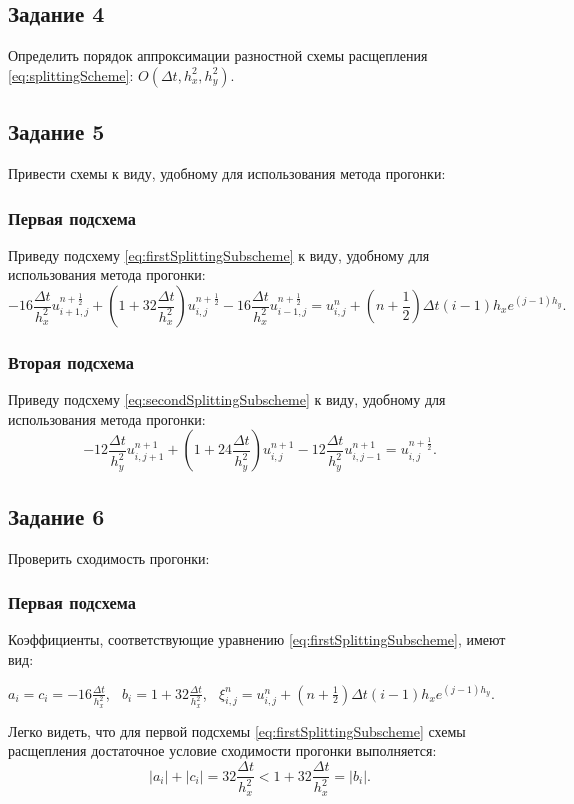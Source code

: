 \documentclass[12pt, a4paper]{report}
\begin{document}
	\subsection*{Задание 4}
	\large
	Определить порядок аппроксимации разностной схемы расщепления \eqref{eq:splittingScheme}: $O(\Delta t, h_{x}^{2}, h_{y}^{2})$.

	\subsection*{Задание 5}
	\large
	Привести схемы к виду, удобному для использования метода прогонки: \par
	\subsubsection*{Первая подсхема}
	\large
	Приведу подсхему \eqref{eq:firstSplittingSubscheme} к виду, удобному для использования метода прогонки:
	\small
	\begin{equation*}
		-16\frac{\Delta t}{h_{x}^{2}}u_{i+1, j}^{n+\frac{1}{2}} + (1 + 32\frac{\Delta t}{h_{x}^{2}})u_{i, j}^{n+\frac{1}{2}} - 16\frac{\Delta t}{h_{x}^{2}}u_{i-1, j}^{n+\frac{1}{2}} = u_{i, j}^{n} + (n + \frac{1}{2})\Delta t(i-1)h_{x}e^{(j-1)h_{y}}.
	\end{equation*}
	\subsubsection*{Вторая подсхема}
	\large
	Приведу подсхему \eqref{eq:secondSplittingSubscheme} к виду, удобному для использования метода прогонки:
	\begin{equation*}
		-12\frac{\Delta t}{h_{y}^{2}}u_{i, j+1}^{n+1} + (1 + 24\frac{\Delta t}{h_{y}^{2}})u_{i, j}^{n+1} - 12\frac{\Delta t}{h_{y}^{2}}u_{i, j-1}^{n+1} = u_{i, j}^{n+\frac{1}{2}}.
	\end{equation*}

	\subsection*{Задание 6}
	\large
	Проверить сходимость прогонки:
	\subsubsection*{Первая подсхема}
	\large
	Коэффициенты, соответствующие уравнению \eqref{eq:firstSplittingSubscheme}, имеют вид:
	\small
	\begin{center}
		$a_{i}=c_{i}=-16\frac{\Delta t}{h_{x}^{2}}$, $\>$ $b_{i}=1 + 32\frac{\Delta t}{h_{x}^{2}}$, $\>$ $\xi_{i, j}^{n}=u_{i, j}^{n} + (n + \frac{1}{2})\Delta t(i-1)h_{x}e^{(j-1)h_{y}}$.
	\end{center}
	\par
	\large
	Легко видеть, что для первой подсхемы \eqref{eq:firstSplittingSubscheme} схемы расщепления достаточное условие сходимости прогонки выполняется:
	\begin{equation*}
		\lvert a_{i} \rvert + \lvert c_{i} \rvert = 32\frac{\Delta t}{h_{x}^{2}} < 1 + 32\frac{\Delta t}{h_{x}^{2}} = \lvert b_{i} \rvert.
	\end{equation*}
\end{document}

